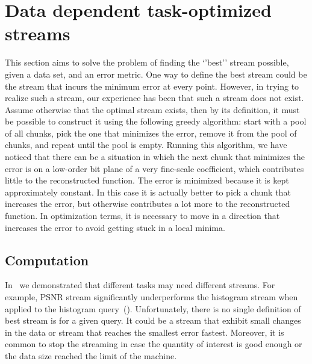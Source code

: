 \section{Data dependent task-optimized streams}
\label{sec:data_dep_streams}

This section aims to solve the problem of finding the `'best'' stream possible, given a data set,
and an error metric. One way to define the best stream could be the stream that incurs the minimum
error at every point. However, in trying to realize such a stream, our experience has been that such
a stream does not exist. Assume otherwise that the optimal stream exists, then by its definition, it
must be possible to construct it using the following greedy algorithm: start with a pool of all
chunks, pick the one that minimizes the error, remove it from the pool of chunks, and repeat until
the pool is empty. Running this algorithm, we have noticed that there can be a situation in which
the next chunk that minimizes the error is on a low-order bit plane of a very fine-scale
coefficient, which contributes little to the reconstructed function. The error is minimized because
it is kept approximately constant. In this case it is actually better to pick a chunk that increases
the error, but otherwise contributes a lot more to the reconstructed function. In optimization
terms, it is necessary to move in a direction that increases the error to avoid getting stuck in a
local minima. 

\subsection{Computation}
In~ we demonstrated that different tasks may need different streams. For
example, PSNR stream significantly underperforms the histogram stream when applied to the histogram
query~(). Unfortunately, there is no single definition of best stream
is for a given query. It could be a stream that exhibit small changes in the data or stream that
reaches the smallest error fastest. Moreover, it is common to stop the streaming in case the
quantity of interest is good enough or the data size reached the limit of the machine.

